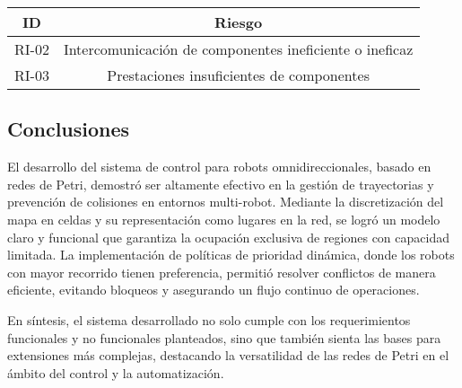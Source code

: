 \begin{center}
    \begin{tabular} {
        | c| c |}
        \hline \rowcolor{test_header_color}
            ID & Riesgo \\
        \hline
            RI-02 & Intercomunicación de componentes ineficiente o ineficaz \\
        \hline
            RI-03 & Prestaciones insuficientes de componentes \\
        \hline
    \end{tabular}
\end{center}

\subsection{Conclusiones}
El desarrollo del sistema de control para robots omnidireccionales, basado en redes de Petri, demostró ser altamente efectivo en la gestión de trayectorias y prevención de colisiones en entornos multi-robot. Mediante la discretización del mapa en celdas y su representación como lugares en la red, se logró un modelo claro y funcional que garantiza la ocupación exclusiva de regiones con capacidad limitada. La implementación de políticas de prioridad dinámica, donde los robots con mayor recorrido tienen preferencia, permitió resolver conflictos de manera eficiente, evitando bloqueos y asegurando un flujo continuo de operaciones.

En síntesis, el sistema desarrollado no solo cumple con los requerimientos funcionales y no funcionales planteados, sino que también sienta las bases para extensiones más complejas, destacando la versatilidad de las redes de Petri en el ámbito del control y la automatización.